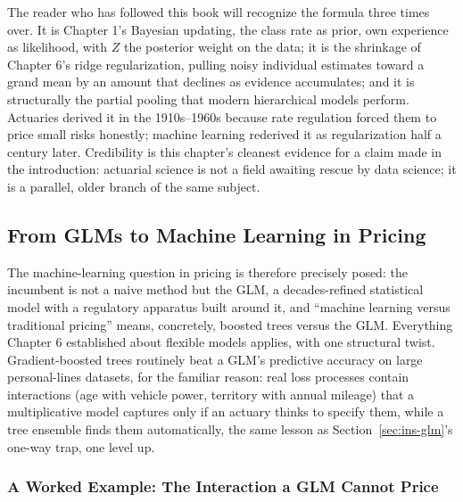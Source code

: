 \documentclass[../ai_in_finance]{subfiles}
\begin{document}
The reader who has followed this book will recognize the formula three times over. It is Chapter 1's Bayesian updating, the class rate as prior, own experience as likelihood, with $Z$ the posterior weight on the data; it is the shrinkage of Chapter 6's ridge regularization, pulling noisy individual estimates toward a grand mean by an amount that declines as evidence accumulates; and it is structurally the partial pooling that modern hierarchical models perform. Actuaries derived it in the 1910s--1960s because rate regulation forced them to price small risks honestly; machine learning rederived it as regularization half a century later. Credibility is this chapter's cleanest evidence for a claim made in the introduction: actuarial science is not a field awaiting rescue by data science; it is a parallel, older branch of the same subject.

\subsection{From GLMs to Machine Learning in Pricing}
\label{sec:ins-ml-pricing}

The machine-learning question in pricing is therefore precisely posed: the incumbent is not a naive method but the GLM, a decades-refined statistical model with a regulatory apparatus built around it, and ``machine learning versus traditional pricing'' means, concretely, boosted trees versus the GLM. Everything Chapter 6 established about flexible models applies, with one structural twist. Gradient-boosted trees routinely beat a GLM's predictive accuracy on large personal-lines datasets, for the familiar reason: real loss processes contain interactions (age with vehicle power, territory with annual mileage) that a multiplicative model captures only if an actuary thinks to specify them, while a tree ensemble finds them automatically, the same lesson as Section~\ref{sec:ins-glm}'s one-way trap, one level up.

\subsubsection*{A Worked Example: The Interaction a GLM Cannot Price}
\label{sec:ins-interaction}
\end{document}

